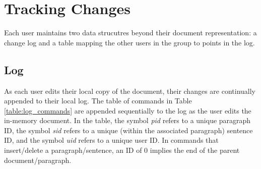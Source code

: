\section{Tracking Changes}

Each user maintains two data strucutres beyond their document
representation: a change log and a table mapping the other users in 
the group to points in the log. 


\subsection{Log}
As each user edits their local copy of the document, their changes
are continually appended to their local log. The table of commands in
Table \ref{table:log_commands} are appended sequentially to the log as the user edits the in-memory
document. In the table, the symbol \emph{pid} refers to a unique paragraph ID, the symbol \emph{sid}
refers to a unique (within the associated paragraph) sentence ID, and the symbol \emph{uid} refers
to a unique user ID. In commands that insert/delete a paragraph/sentence, an ID of 0 implies the end of
the parent document/paragraph.

